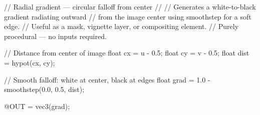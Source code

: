 // Radial gradient — circular falloff from center
//
// Generates a white-to-black gradient radiating outward
// from the image center using smoothstep for a soft edge.
// Useful as a mask, vignette layer, or compositing element.
// Purely procedural — no inputs required.

// Distance from center of image
float cx = u - 0.5;
float cy = v - 0.5;
float dist = hypot(cx, cy);

// Smooth falloff: white at center, black at edges
float grad = 1.0 - smoothstep(0.0, 0.5, dist);

@OUT = vec3(grad);